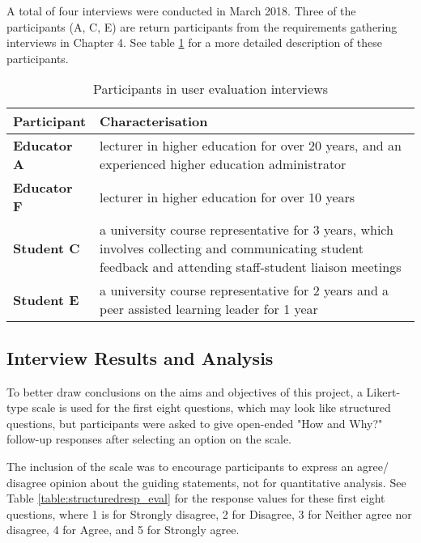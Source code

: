 A total of four interviews were conducted in March 2018.
Three of the participants (A, C, E) are return participants from the requirements gathering interviews in Chapter 4.
See table \ref{table:participants-eval} for a more detailed description of these participants.

\begin{table}[!h]
	\caption{Participants in user evaluation interviews}
	\centering
	\label{table:participants-eval}
	\begin{tabularx}{\textwidth}{>{\bfseries}lX}
		Participant & Characterisation                                                                    \\
		\toprule
		Educator A  & lecturer in higher education for over 20 years, and an experienced higher education
		administrator                                                                                     \\\midrule
		Educator F  & lecturer in higher education for over 10 years                                      \\\midrule
		Student C   & a university course representative for 3 years, which involves collecting and
		communicating student feedback and attending staff-student liaison meetings                       \\\midrule
		Student E   & a university course representative for 2 years and a peer assisted learning leader
		for 1 year                                                                                        \\\bottomrule
	\end{tabularx}
\end{table}

\subsection{Interview Results and Analysis}

To better draw conclusions on the aims and objectives of this project, 
a Likert-type scale is used for the first eight questions, 
which may look like structured questions, but participants were asked to give 
open-ended "How and Why?" follow-up responses after selecting an option on the scale. 

The inclusion of the scale was to encourage participants to express an agree/ disagree opinion 
about the guiding statements, not for quantitative analysis. 
See Table \ref{table:structuredresp_eval} for 
the response values for these first eight questions,
where 1 is for Strongly disagree, 2 for Disagree, 3 for Neither agree nor disagree, 
4 for Agree, and 5 for Strongly agree.

